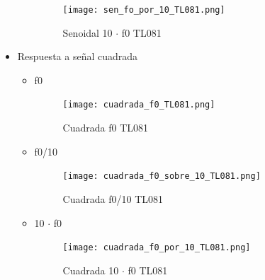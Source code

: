 \documentclass[11pt]{diazessay} %
\begin{document}
\begin{itemize}
\begin{itemize}
\begin{figure}[h]
\centering
	\texttt{[image: sen\_fo\_por\_10\_TL081.png]}
\caption{Senoidal 10 $\cdot$ f0 TL081}
\end{figure}
\end{itemize}

\newpage
\item Respuesta a señal cuadrada
\begin{itemize}
\item f0
\begin{figure}[h]
\centering
	\texttt{[image: cuadrada\_f0\_TL081.png]}
\caption{Cuadrada f0 TL081}
\end{figure}

\newpage
\item f0/10
\begin{figure}[h]
\centering
	\texttt{[image: cuadrada\_f0\_sobre\_10\_TL081.png]}
\caption{Cuadrada f0/10 TL081}
\end{figure}

\newpage
\item 10 $\cdot$ f0
\begin{figure}[h]
\centering
	\texttt{[image: cuadrada\_f0\_por\_10\_TL081.png]}
\caption{Cuadrada 10 $\cdot$ f0 TL081}
\end{figure}

\end{itemize}

\end{itemize}

\end{document}
